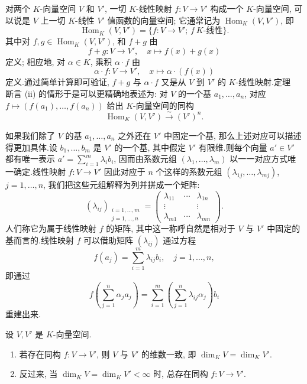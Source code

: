 对两个 $K$-向量空间 $V$ 和 $V'$, 一切 $K$-线性映射 $f \colon V \longrightarrow V'$ 构成一个 $K$-向量空间, 可以说是 $V$ 上一切 $K$-线性 $V'$ 值函数的向量空间; 它通常记为 $\operatorname{Hom}_K(V, V')$, 即
\[
\operatorname{Hom}_K(V, V') = \{f \colon V \longrightarrow V';\, f\ \text{$K$-线性}\}\text{.}
\]
其中对 $f, g \in \operatorname{Hom}_K(V, V')$, 和 $f + g$ 由
\[
f + g \colon V \longrightarrow V', \quad x \longmapsto f(x) + g(x)
\]
定义; 相应地, 对 $\alpha \in K$, 乘积 $\alpha \cdot f$ 由
\[
\alpha \cdot f \colon V \longrightarrow V', \quad x \longmapsto \alpha \cdot (f(x))
\]
定义.通过简单计算即可验证, $f + g$ 与 $\alpha \cdot f$ 又是从 $V$ 到 $V'$ 的 $K$-线性映射.定理~ 断言 (ii) 的情形于是可以更精确地表述为: 对 $V$ 的一个基 $a_1, \ldots, a_n$, 对应 $f \longmapsto (f(a_1), \ldots, f(a_n))$ 给出 $K$-向量空间的同构
\[
\operatorname{Hom}_K(V, V') \overset{\sim}{\longrightarrow} (V')^n\text{.}
\]

如果我们除了 $V$ 的基 $a_1, \ldots, a_n$ 之外还在 $V'$ 中固定一个基, 那么上述对应可以描述得更加具体.设 $b_1, \ldots, b_m$ 是 $V'$ 的一个基, 其中假定 $V'$ 有限维.则每个向量 $a' \in V'$ 都有唯一表示 $a' = \sum_{i = 1}^{m} \lambda_i b_i$, 因而由系数元组 $(\lambda_1, \ldots, \lambda_m)$ 以一一对应方式唯一确定.线性映射 $f \colon V \longrightarrow V'$ 因此对应于 $n$ 个这样的系数元组 $(\lambda_{1j}, \ldots, \lambda_{mj})$, $j = 1, \ldots, n$, 我们把这些元组解释为列并拼成一个矩阵:
\[
(\lambda_{ij})_{\substack{i = 1, \ldots, m \\ j = 1, \ldots, n}} = \begin{pmatrix} \lambda_{11} & \cdots & \lambda_{1n} \\ \vdots & & \vdots \\ \lambda_{m1} & \cdots & \lambda_{mn} \end{pmatrix}\text{.}
\]
人们称它为属于线性映射 $f$ 的矩阵, 其中这一称呼自然是相对于 $V$ 与 $V'$ 中固定的基而言的.线性映射 $f$ 可以借助矩阵 $(\lambda_{ij})$ 通过方程
\[
f(a_j) = \sum_{i = 1}^{m} \lambda_{ij} b_i, \quad j = 1, \ldots, n,
\]
即通过
\[
f\left(\sum_{j = 1}^{n} \alpha_j a_j\right) = \sum_{i = 1}^{m} \left(\sum_{j = 1}^{n} \lambda_{ij}\alpha_j\right) b_i
\]
重建出来.

\begin{theorem}\label{thm:2.1.8}
设 $V, V'$ 是 $K$-向量空间.
\begin{enumerate}
\item[(i)] 若存在同构 $f \colon V \longrightarrow V'$, 则 $V$ 与 $V'$ 的维数一致, 即 $\dim_K V = \dim_K V'$.
\item[(ii)] 反过来, 当 $\dim_K V = \dim_K V' < \infty$ 时, 总存在同构 $f \colon V \longrightarrow V'$.
\end{enumerate}
\end{theorem}

